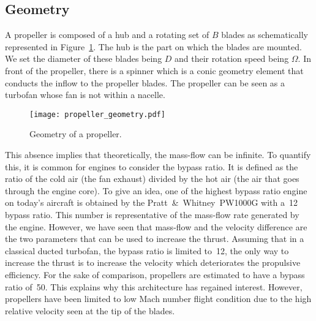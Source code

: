 
\subsection{Geometry}
\label{sub:cror_propeller_geometry}

A propeller is composed of a hub and a rotating set of 
$B$ blades as schematically represented in
Figure~\ref{fig:cror_propeller_geometry}. The hub
is the part on which the blades are mounted.
We set the diameter of these blades being $D$
and their rotation speed being $\Omega$. 
In front of the propeller, there is a spinner which is
a conic geometry element that conducts the 
inflow to the propeller blades.
The propeller can be seen as
a turbofan whose fan is not within a nacelle.
\begin{figure}[htp]
  \centering
  \texttt{[image: propeller\_geometry.pdf]}
  \caption{Geometry of a propeller.}
  \label{fig:cror_propeller_geometry}
\end{figure}
This absence implies that theoretically, the mass-flow can be
infinite. To quantify this, it is common for engines to
consider the bypass ratio. It is defined as the ratio of the
cold air (the fan exhaust)
divided by the hot air (the air that goes through the engine core).
To give an idea, one of the highest bypass ratio engine on today's aircraft is obtained
by the Pratt~\&~Whitney~PW1000G with a~12 bypass ratio. 
This number is representative of the mass-flow rate generated by the engine.
However, we have seen that mass-flow and the velocity
difference are the two parameters that can be used to increase
the thrust. Assuming that in a classical ducted turbofan, 
the bypass ratio is limited to~12, the only
way to increase the thrust is to increase the 
velocity which deteriorates the propulsive efficiency.
For the sake of comparison, 
propellers are estimated to have a bypass ratio of~50. 
This explains why this architecture has
regained interest. However, propellers
have been limited to low Mach number flight condition
due to the high relative velocity seen at the tip of the blades.

